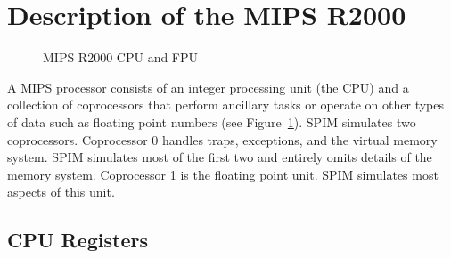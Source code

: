 \documentclass[11pt]{article}
\begin{document}
\section{Description of the MIPS R2000}
\label{sec:mips}

\begin{figure}
  \centerline{}
  \caption{MIPS R2000 CPU and FPU}
  \label{fig:mips}
\end{figure}
A MIPS processor consists of an integer processing unit (the CPU) and
a collection of coprocessors that perform ancillary tasks or operate
on other types of data such as floating point numbers (see
Figure~\ref{fig:mips}).  SPIM simulates two coprocessors.  Coprocessor
0 handles traps, exceptions, and the virtual memory system.  SPIM
simulates most of the first two and entirely omits details of the
memory system.  Coprocessor 1 is the floating point unit.  SPIM
simulates most aspects of this unit.

\subsection{CPU Registers}
\end{document}
